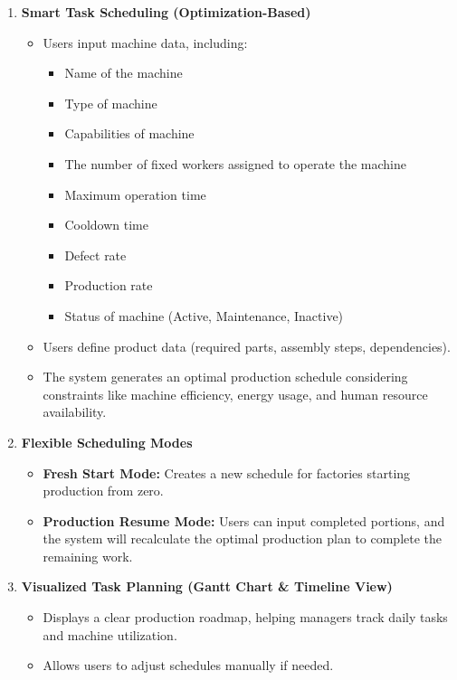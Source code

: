 \begin{enumerate}[leftmargin=80pt]
    \item \textbf{Smart Task Scheduling (Optimization-Based)}
    \begin{itemize}
        \item Users input machine data, including:
        \begin{itemize}
            \item Name of the machine
            \item Type of machine
            \item Capabilities of machine
            \item The number of fixed workers assigned to operate the machine
            \item Maximum operation time
            \item Cooldown time
            \item Defect rate
            \item Production rate
            \item Status of machine (Active, Maintenance, Inactive)
        \end{itemize}
        \item Users define product data (required parts, assembly steps, dependencies).
        \item The system generates an optimal production schedule considering constraints like machine efficiency, energy usage, and human resource availability.
    \end{itemize}

    \item \textbf{Flexible Scheduling Modes}  
    \begin{itemize}
        \item \textbf{Fresh Start Mode:} Creates a new schedule for factories starting production from zero.  
        \item \textbf{Production Resume Mode:} Users can input completed portions, and the system will recalculate the optimal production plan to complete the remaining work.  
    \end{itemize}

    \item \textbf{Visualized Task Planning (Gantt Chart \& Timeline View)}
    \begin{itemize}
        \item Displays a clear production roadmap, helping managers track daily tasks and machine utilization.
        \item Allows users to adjust schedules manually if needed.
    \end{itemize}
\end{enumerate}

